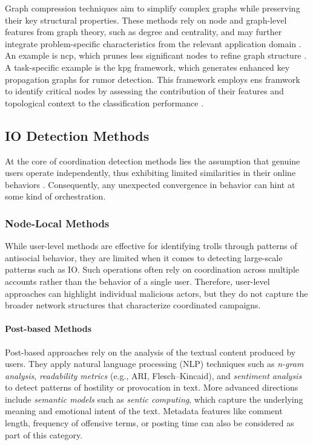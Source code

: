 \documentclass{article}
\begin{document}
Graph compression techniques aim to simplify complex graphs while preserving their key structural properties. These methods rely on node and graph-level features from graph theory, such as degree and centrality, and may further integrate problem-specific characteristics from the relevant application domain \cite{graphCompression2018survey}.  
An example is \ac{ncp}, which prunes less significant nodes to refine graph structure \cite{NodeCentric2024Pruning}. A task-specific example is the \ac{kpg} framework, which generates enhanced key propagation graphs for rumor detection. This framework employs \ac{ens} framwork to identify critical nodes by assessing the contribution of their features and topological context to the classification performance \cite{RumorDetection2025GraphGenerator}.  




\subsection{IO Detection Methods}

At the core of coordination detection methods lies the assumption that genuine users operate independently, thus exhibiting limited
similarities in their online behaviors . Consequently, any unexpected convergence in behavior can hint at some kind of orchestration. \cite{uncovering2021networks, mannocci2024detection, unveiling2020whiteHelmets}

\subsubsection{Node-Local Methods}

While user-level methods are effective for identifying trolls through patterns of antisocial behavior, they are limited when it comes to detecting large-scale patterns such as IO. 
Such operations often rely on coordination across multiple accounts rather than the behavior of a single 
user. Therefore, user-level approaches can highlight individual malicious actors, but they do not capture the broader network structures that characterize coordinated campaigns. \cite{troll2020detection}

\paragraph{Post-based Methods} Post-based approaches rely on the analysis of the textual content produced by users. 
They apply natural language processing (NLP) techniques such as \textit{n-gram analysis}, 
\textit{readability metrics} (e.g., ARI, Flesch–Kincaid), and \textit{sentiment analysis} to 
detect patterns of hostility or provocation in text. More advanced directions include 
\textit{semantic models} such as \textit{sentic computing}, which capture the underlying meaning 
and emotional intent of the text. Metadata features like comment length, frequency of offensive 
terms, or posting time can also be considered as part of this category. \cite{TrollDetection2015sentiment}
\end{document}
